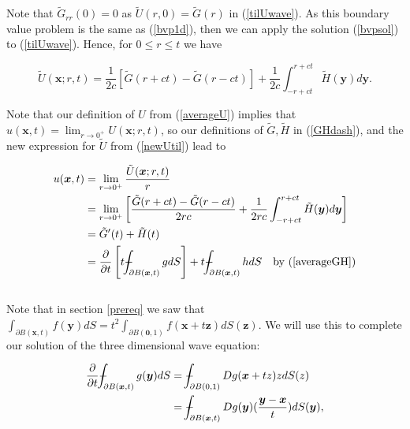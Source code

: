 \documentclass[a4paper, 12pt]{article}
\def\Xint#1{\mathchoice
{\XXint\displaystyle\textstyle{#1}}%
{\XXint\textstyle\scriptstyle{#1}}%
{\XXint\scriptstyle\scriptscriptstyle{#1}}%
{\XXint\scriptscriptstyle\scriptscriptstyle{#1}}%
\!\int}
\def\XXint#1#2#3{{\setbox0=\hbox{$#1{#2#3}{\int}$ }
\vcenter{\hbox{$#2#3$ }}\kern-.6\wd0}}
\def\dashint{\Xint-}
\numberwithin{equation}{section}
\begin{document}
Note that $\tilde{G}_{rr}(0)=0$ as $\tilde{U}(r,0)=\tilde{G}(r)$ in
(\ref{tilUwave}). As this boundary value problem is the same as (\ref{bvp1d}),
then we can apply the solution (\ref{bvpsol}) to (\ref{tilUwave}). Hence, for $0
\le r \le t$ we have 

\begin{equation} \label{newUtil}
    \tilde{U}(\boldsymbol{x};r,t)=\frac{1}{2c}\left[\tilde{G}(r+ct)-\tilde{G}(r-ct)\right]+\frac{1}{2c}\int^{r+ct}_{-r+ct}\tilde{H}(\boldsymbol{y})d\boldsymbol{y}.
\end{equation} 

Note that our definition of $U$ from (\ref{averageU}) implies that
 $u(\boldsymbol{x},t)=\lim_{r\rightarrow 0^+}U(\boldsymbol{x};r,t)$, so our
 definitions of $\tilde{G}, \tilde{H}$ in (\ref{GHdash}), and the new expression
 for $\tilde{U}$ from (\ref{newUtil}) lead to

\begin{equation} \label{almostK}
    \begin{aligned}
        u(\boldsymbol{x},t)&=\lim_{r\rightarrow 0^+}\frac{\tilde{U}(\boldsymbol{x};r,t)}{r}\\
        &=\lim_{r\rightarrow 0^+}\left[\frac{\tilde{G}(r+ct)-\tilde{G}(r-ct)}{2rc}+\frac{1}{2rc}\int^{r+ct}_{-r+ct}\tilde{H}(\boldsymbol{y})d\boldsymbol{y}\right]\\
        &=\tilde{G}'(t)+\tilde{H}(t)\\
        &=\diffp[1]{}{t}\left[t\dashint_{\partial B(\boldsymbol{x},t)}{gdS} \right]+t\dashint_{\partial B(\boldsymbol{x},t)}{hdS} \quad \textrm{by (\ref{averageGH})}
    \end{aligned}
\end{equation}
\\

Note that in section \ref{prereq} we saw that $\int_{\partial
B(\boldsymbol{x},t)}f(\boldsymbol{y})dS=t^2\int_{\partial B(\boldsymbol{0},1)}
f(\boldsymbol{x}+t\boldsymbol{z})dS(\boldsymbol{z})$. We will use this to
complete our solution of the three dimensional wave equation:

\begin{equation*}
    \begin{aligned}
    \diffp[1]{}{t}\dashint_{\partial B(\boldsymbol{x},t)} {g(\boldsymbol{y})dS} &= \dashint_{\partial B(0,1)} {Dg(\boldsymbol{x}+tz)zdS(z)}\\
    &=\dashint_{\partial B(\boldsymbol{x},t)}{Dg(\boldsymbol{y})(\frac{\boldsymbol{y}-\boldsymbol{x}}{t})dS(\boldsymbol{y})},
    \end{aligned}
\end{equation*}
\end{document}
